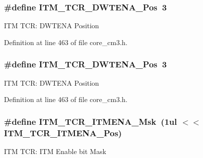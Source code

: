 \subsubsection[{\texorpdfstring{I\+T\+M\+\_\+\+T\+C\+R\+\_\+\+D\+W\+T\+E\+N\+A\+\_\+\+Pos}{ITM_TCR_DWTENA_Pos}}]{\setlength{\rightskip}{0pt plus 5cm}\#define I\+T\+M\+\_\+\+T\+C\+R\+\_\+\+D\+W\+T\+E\+N\+A\+\_\+\+Pos~3}\hypertarget{group___c_m_s_i_s___c_m3___i_t_m_ga30e83ebb33aa766070fe3d1f27ae820e}{}\label{group___c_m_s_i_s___c_m3___i_t_m_ga30e83ebb33aa766070fe3d1f27ae820e}
I\+TM T\+CR\+: D\+W\+T\+E\+NA Position 

Definition at line 463 of file core\+\_\+cm3.\+h.

\subsubsection[{\texorpdfstring{I\+T\+M\+\_\+\+T\+C\+R\+\_\+\+D\+W\+T\+E\+N\+A\+\_\+\+Pos}{ITM_TCR_DWTENA_Pos}}]{\setlength{\rightskip}{0pt plus 5cm}\#define I\+T\+M\+\_\+\+T\+C\+R\+\_\+\+D\+W\+T\+E\+N\+A\+\_\+\+Pos~3}\hypertarget{group___c_m_s_i_s___c_m3___i_t_m_ga30e83ebb33aa766070fe3d1f27ae820e}{}\label{group___c_m_s_i_s___c_m3___i_t_m_ga30e83ebb33aa766070fe3d1f27ae820e}
I\+TM T\+CR\+: D\+W\+T\+E\+NA Position 

Definition at line 463 of file core\+\_\+cm3.\+h.

\subsubsection[{\texorpdfstring{I\+T\+M\+\_\+\+T\+C\+R\+\_\+\+I\+T\+M\+E\+N\+A\+\_\+\+Msk}{ITM_TCR_ITMENA_Msk}}]{\setlength{\rightskip}{0pt plus 5cm}\#define I\+T\+M\+\_\+\+T\+C\+R\+\_\+\+I\+T\+M\+E\+N\+A\+\_\+\+Msk~(1ul $<$$<$ I\+T\+M\+\_\+\+T\+C\+R\+\_\+\+I\+T\+M\+E\+N\+A\+\_\+\+Pos)}\hypertarget{group___c_m_s_i_s___c_m3___i_t_m_ga7dd53e3bff24ac09d94e61cb595cb2d9}{}\label{group___c_m_s_i_s___c_m3___i_t_m_ga7dd53e3bff24ac09d94e61cb595cb2d9}
I\+TM T\+CR\+: I\+TM Enable bit Mask 

